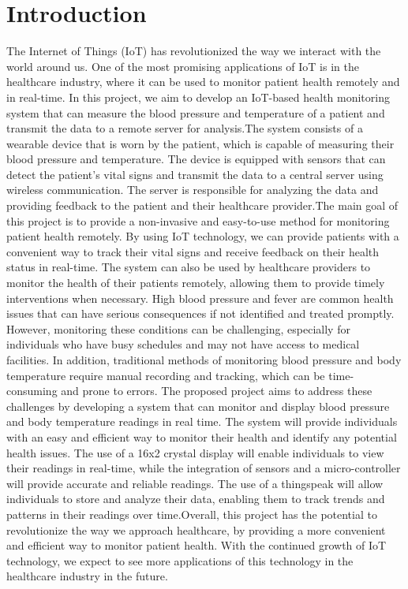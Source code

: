 \documentclass[conference]{IEEEtran}
\begin{document}
\section{Introduction}
The Internet of Things (IoT) has revolutionized the way we interact with the world around us. One of the most promising applications of IoT is in the healthcare industry, where it can be used to monitor patient health remotely and in real-time. In this project, we aim to develop an IoT-based health monitoring system that can measure the blood pressure and temperature of a patient and transmit the data to a remote server for analysis.The system consists of a wearable device that is worn by the patient, which is capable of measuring their blood pressure and temperature. The device is equipped with sensors that can detect the patient's vital signs and transmit the data to a central server using wireless communication. The server is responsible for analyzing the data and providing feedback to the patient and their healthcare provider.The main goal of this project is to provide a non-invasive and easy-to-use method for monitoring patient health remotely. By using IoT technology, we can provide patients with a convenient way to track their vital signs and receive feedback on their health status in real-time. The system can also be used by healthcare providers to monitor the health of their patients remotely, allowing them to provide timely interventions when necessary.
High blood pressure and fever are common health issues that can have serious consequences if not identified and treated promptly. However, monitoring these conditions can be challenging, especially for individuals who have busy schedules and may not have access to medical facilities. In addition, traditional methods of monitoring blood pressure and body temperature require manual recording and tracking, which can be time-consuming and prone to errors.
The proposed project aims to address these challenges by developing a system that can monitor and display blood pressure and body temperature readings in real time. The system will provide individuals with an easy and efficient way to monitor their health and identify any potential health issues. The use of a 16x2 crystal display will enable individuals to view their readings in real-time, while the integration of sensors and a micro-controller will provide accurate and reliable readings. The use of a thingspeak  will allow individuals to store and analyze their data, enabling them to track trends and patterns in their readings over time.Overall, this project has the potential to revolutionize the way we approach healthcare, by providing a more convenient and efficient way to monitor patient health. With the continued growth of IoT technology, we expect to see more applications of this technology in the healthcare industry in the future.
\end{document}
